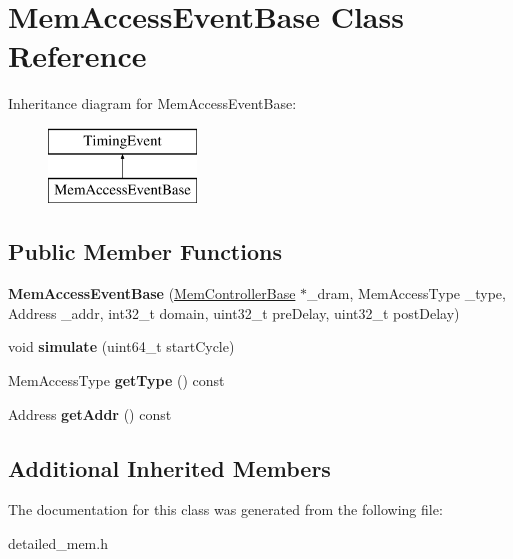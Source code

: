 \hypertarget{classMemAccessEventBase}{\section{Mem\-Access\-Event\-Base Class Reference}
\label{classMemAccessEventBase}
}
Inheritance diagram for Mem\-Access\-Event\-Base\-:\begin{figure}[H]
\begin{center}
\leavevmode
\includegraphics[height=2.000000cm]{classMemAccessEventBase}
\end{center}
\end{figure}
\subsection*{Public Member Functions}
\begin{DoxyCompactItemize}
\item 
\hypertarget{classMemAccessEventBase_abc754afb4dad414c2e41cb6a78a28783}{{\bfseries Mem\-Access\-Event\-Base} (\hyperlink{classMemControllerBase}{Mem\-Controller\-Base} $\ast$\-\_\-dram, Mem\-Access\-Type \-\_\-type, Address \-\_\-addr, int32\-\_\-t domain, uint32\-\_\-t pre\-Delay, uint32\-\_\-t post\-Delay)}\label{classMemAccessEventBase_abc754afb4dad414c2e41cb6a78a28783}

\item 
\hypertarget{classMemAccessEventBase_a5ef5c4322e608e54eed1930855333f80}{void {\bfseries simulate} (uint64\-\_\-t start\-Cycle)}\label{classMemAccessEventBase_a5ef5c4322e608e54eed1930855333f80}

\item 
\hypertarget{classMemAccessEventBase_ac85f64b8558421bf47cb7a60e990ff17}{Mem\-Access\-Type {\bfseries get\-Type} () const }\label{classMemAccessEventBase_ac85f64b8558421bf47cb7a60e990ff17}

\item 
\hypertarget{classMemAccessEventBase_a9cc9d17bda3a19800a4f11e7e2891632}{Address {\bfseries get\-Addr} () const }\label{classMemAccessEventBase_a9cc9d17bda3a19800a4f11e7e2891632}

\end{DoxyCompactItemize}
\subsection*{Additional Inherited Members}


The documentation for this class was generated from the following file\-:\begin{DoxyCompactItemize}
\item 
detailed\-\_\-mem.\-h\end{DoxyCompactItemize}

